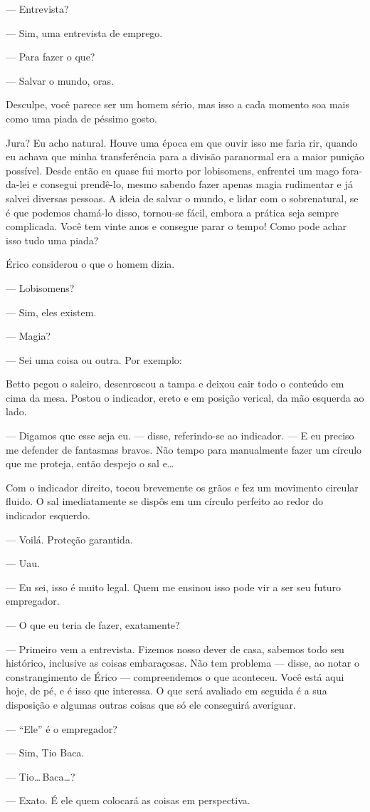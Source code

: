 --- Entrevista?

--- Sim, uma entrevista de emprego.

--- Para fazer o que?

--- Salvar o mundo, oras.

Desculpe, você parece ser um homem sério, mas isso a cada momento soa mais como
uma piada de péssimo gosto.

Jura? Eu acho natural. Houve uma época em que ouvir isso me faria rir, quando
eu achava que minha transferência para a divisão paranormal era a maior punição
possível. Desde então eu quase fui morto por lobisomens, enfrentei um mago
fora-da-lei e consegui prendê-lo, mesmo sabendo fazer apenas magia rudimentar e
já salvei diversas pessoas. A ideia de salvar o mundo, e lidar com o
sobrenatural, se é que podemos chamá-lo disso, tornou-se fácil, embora a
prática seja sempre complicada. Você tem vinte anos e consegue parar o tempo!
Como pode achar isso tudo uma piada?

Érico considerou o que o homem dizia.

--- Lobisomens?

--- Sim, eles existem.

--- Magia?

--- Sei uma coisa ou outra. Por exemplo:

Betto pegou o saleiro, desenroscou a tampa e deixou cair todo o conteúdo em
cima da mesa. Postou o indicador, ereto e em posição verical, da mão esquerda
ao lado.

--- Digamos que esse seja eu. --- disse, referindo-se ao indicador. --- E eu
preciso me defender de fantasmas bravos. Não tempo para manualmente fazer um
círculo que me proteja, então despejo o sal e\ldots

Com o indicador direito, tocou brevemente os grãos e fez um movimento circular
fluido. O sal imediatamente se dispôs em um círculo perfeito ao redor do
indicador esquerdo.

--- Voilá. Proteção garantida.

--- Uau.

--- Eu sei, isso é muito legal. Quem me ensinou isso pode vir a ser seu futuro
empregador.

--- O que eu teria de fazer, exatamente?

--- Primeiro vem a entrevista. Fizemos nosso dever de casa, sabemos todo seu
histórico, inclusive as coisas embaraçosas. Não tem problema --- disse, ao
notar o constrangimento de Érico --- compreendemos o que aconteceu. Você está
aqui hoje, de pé, e é isso que interessa. O que será avaliado em seguida é a
sua disposição e algumas outras coisas que só ele conseguirá averiguar.

--- “Ele” é o empregador?

--- Sim, Tio Baca.

--- Tio\ldots\,Baca\ldots?

--- Exato. É ele quem colocará as coisas em perspectiva.

